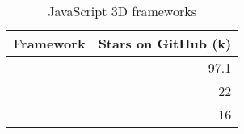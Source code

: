 \begin{table}[ht]
\centering
\caption{JavaScript 3D frameworks}
\label{tab:github3dFrameworks}
\begin{tabular}[t]{|l|r|}
\toprule
Framework & Stars on GitHub (k)\\
\midrule
\cite{githubThreeJs} & 97.1\\
\cite{githubBabylonJs} & 22\\
\cite{githubAFrame} & 16\\
\bottomrule
\end{tabular}
\end{table}
